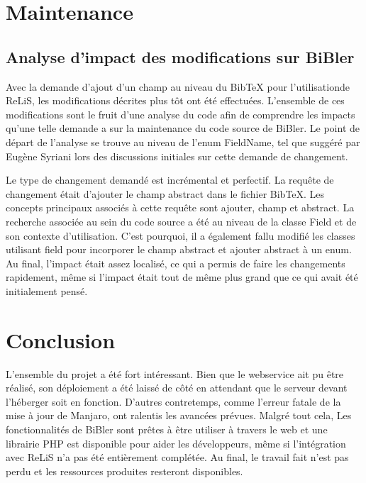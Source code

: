 \documentclass[12pt,titlepage]{article}
\let\oldsection\section
\renewcommand\section{\clearpage\oldsection}
\begin{document}
\section{Maintenance}
\subsection{Analyse d'impact des modifications sur BiBler}
Avec la demande d'ajout d'un champ au niveau du BibTeX pour l'utilisationde ReLiS, les modifications décrites plus tôt ont été effectuées. L'ensemble de ces modifications sont le fruit d'une analyse du code afin de comprendre les impacts qu'une telle demande a sur la maintenance du code source de BiBler. Le point de départ de l'analyse se trouve au niveau de l'enum FieldName, tel que suggéré par Eugène Syriani lors des discussions initiales sur cette demande de changement. \newline

Le type de changement demandé est incrémental et perfectif. La requête de changement était d'ajouter le champ abstract dans le fichier BibTeX. Les concepts principaux associés à cette requête sont ajouter, champ et abstract. La recherche associée au sein du code source a été au niveau de la classe Field et de son contexte d'utilisation. C'est pourquoi, il a également fallu modifié les classes utilisant field pour incorporer le champ abstract et ajouter abstract à un enum. Au final, l'impact était assez localisé, ce qui a permis de faire les changements rapidement, même si l'impact était tout de même plus grand que ce qui avait été initialement pensé.




\section{Conclusion}
L'ensemble du projet a été fort intéressant. Bien que le webservice ait pu être réalisé, son déploiement a été laissé de côté en attendant que le serveur devant l'héberger soit en fonction. D'autres contretemps, comme l'erreur fatale de la mise à jour de Manjaro, ont ralentis les avancées prévues. Malgré tout cela, Les fonctionnalités de BiBler sont prêtes à être utiliser à travers le web et une librairie PHP est disponible pour aider les développeurs, même si l'intégration avec ReLiS n'a pas été entièrement complétée. Au final, le travail fait n'est pas perdu et les ressources produites resteront disponibles.\newline
\end{document}
